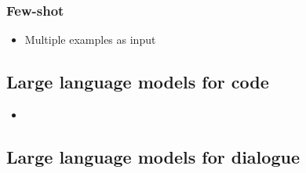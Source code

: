 \documentclass[11pt]{article}
\begin{document}
\subsubsection{Few-shot}

\begin{minipage}[l]{.5\linewidth}
    \begin{figure}[H]
        \centering
    \end{figure}    
\end{minipage}\hfill
\begin{minipage}[r]{.48\linewidth}
    \begin{itemize}
        \item Multiple examples as input
    \end{itemize}
\end{minipage}

\subsection{Large language models for code}

\begin{minipage}[l]{.5\linewidth}
    \begin{figure}[H]
        \centering
    \end{figure}    
\end{minipage}\hfill
\begin{minipage}[r]{.48\linewidth}
    \begin{itemize}
        \item
    \end{itemize}
\end{minipage}

\subsection{Large language models for dialogue}

\begin{figure}[H]
    \centering
\end{figure}    
\end{document}
